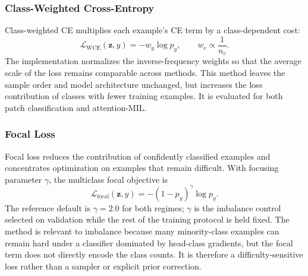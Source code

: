 \documentclass[11pt]{article}
\begin{document}
\subsubsection{Class-Weighted Cross-Entropy}
Class-weighted CE multiplies each example's CE term by a class-dependent cost:
\begin{equation}
  \mathcal{L}_{\mathrm{WCE}}(\mathbf{z},y) = -w_y\log p_y,
  \qquad
  w_c \propto \frac{1}{n_c}.
  \label{eq:weighted-ce}
\end{equation}
The implementation normalizes the inverse-frequency weights so that the average scale of the loss remains comparable across methods. This method leaves the sample order and model architecture unchanged, but increases the loss contribution of classes with fewer training examples. It is evaluated for both patch classification and attention-MIL.

\subsubsection{Focal Loss}
Focal loss reduces the contribution of confidently classified examples and concentrates optimization on examples that remain difficult. With focusing parameter $\gamma$, the multiclass focal objective is
\begin{equation}
  \mathcal{L}_{\mathrm{focal}}(\mathbf{z},y) =
  -(1-p_y)^{\gamma}\log p_y.
  \label{eq:focal}
\end{equation}
The reference default is $\gamma=\num{2.0}$ for both regimes; $\gamma$ is the imbalance control selected on validation while the rest of the training protocol is held fixed. The method is relevant to imbalance because many minority-class examples can remain hard under a classifier dominated by head-class gradients, but the focal term does not directly encode the class counts. It is therefore a difficulty-sensitive loss rather than a sampler or explicit prior correction.
\end{document}
